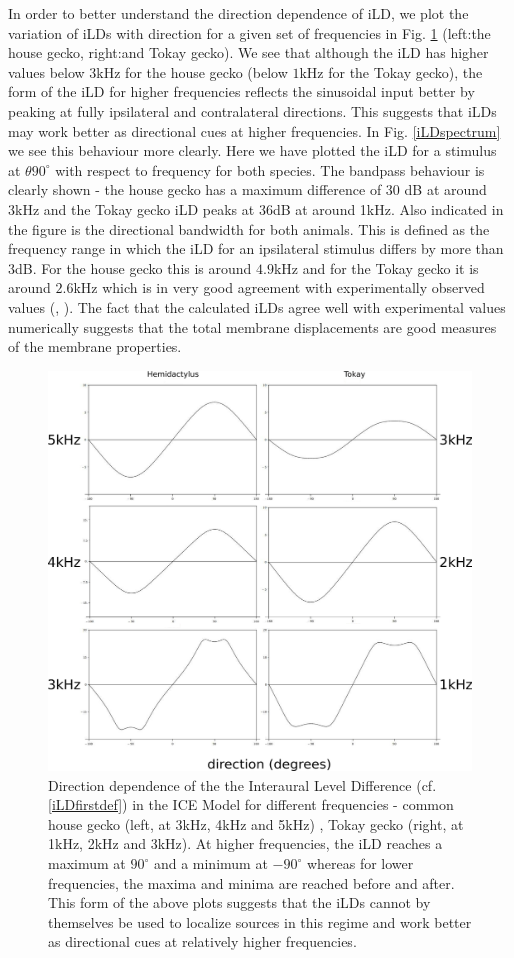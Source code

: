 In order to better understand the direction dependence of iLD, we plot the variation
of iLDs with direction for a given set of frequencies in Fig. \ref{iLDdirection} (left:the house gecko, right:and Tokay gecko). We see that although the 
iLD has higher values below $3$kHz for the house gecko (below $1$kHz for the Tokay gecko), the form of the iLD for higher frequencies reflects the sinusoidal input better by peaking at fully
ipsilateral and contralateral directions. This suggests that iLDs may work better as directional cues at higher frequencies. In Fig. \ref{iLDspectrum}
we see this behaviour more clearly. Here we have plotted the iLD for a stimulus at $\theta 90^\circ$ with respect to frequency for both species. The bandpass behaviour
is clearly shown - the house gecko has a maximum difference of $30$ dB at around 3kHz and the Tokay gecko iLD peaks at $36$dB at around 1kHz. Also indicated in the figure is the directional bandwidth
for both animals. This is defined as the frequency range in which the iLD for an ipsilateral stimulus differs by more than 3dB. For the house gecko this is around $4.9$kHz and for the Tokay gecko it is around
$2.6$kHz which is in very good agreement with experimentally observed values (\cite{dalsgaardmanley1}, \cite{dalsgaardmanley2}). The fact that the calculated iLDs
agree well with experimental values numerically suggests that the total membrane displacements are good measures of the membrane properties.
\begin{figure}[ht!]
\centering
  \includegraphics[width=.5\linewidth]{Diagrams/Plots/iLD/all.png}
  \caption[Direction dependence of the Interaural Level Difference for different frequencies.]{Direction dependence of the the Interaural Level Difference (cf. \eqref{iLDfirstdef}) in the ICE Model for different frequencies - common house gecko (left, at 3kHz, 4kHz and 5kHz)
  , Tokay gecko (right, at 1kHz, 2kHz and 3kHz). At higher frequencies, the iLD reaches a maximum at $90^\circ$ and a minimum at $-90^\circ$ whereas for lower frequencies, the maxima and minima are 
  reached before and after. This form of the above plots suggests that the iLDs cannot by themselves be used to localize sources in this regime and work better as directional cues at relatively higher frequencies.}
  \label{iLDdirection}
\end{figure}

